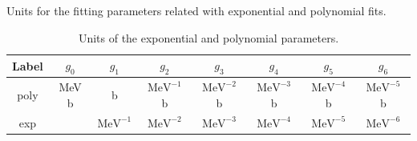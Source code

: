 \documentclass[openany]{book}
\begin{document}
Units for the fitting parameters related with exponential and polynomial fits.

\begin{table}[H]
	\centering
	\begin{tabular}{|c|c|c|c|c|c|c|c|}
		\hline
		Label & $g_0$ & $g_1$  & $g_2$   & $g_3$ &  $g_4$ &  $g_5$ & $g_6$   \\  \hline
		poly &  MeV b & b & $\mathrm{{MeV}^{-1}}$ b &  $\mathrm{{MeV}^{-2}}$ b &  $\mathrm{{MeV}^{-3}}$ b & $\mathrm{{MeV}^{-4}}$ b & $\mathrm{{MeV}^{-5}}$ b  \\  \hline
		exp &  &  $\mathrm{{MeV}^{-1}}$  & $\mathrm{{MeV}^{-2}}$  &  $\mathrm{{MeV}^{-3}}$  &  $\mathrm{{MeV}^{-4}}$  &  $\mathrm{{MeV}^{-5}}$ & $\mathrm{{MeV}^{-6}}$    \\ \hline
	\end{tabular}
	\caption[Units of the exponential and polynomial parameters.]{Units of the exponential and polynomial parameters.}
	\label{table:fitting_empirical_polyexp_units}
\end{table}
\end{document}
